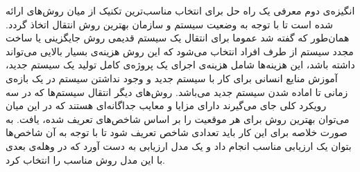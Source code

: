 انگیزه‌ی دوم معرفی یک راه حل برای انتخاب مناسب‌ترین تکنیک از میان روش‌های ارائه شده است  تا با توجه به وضعیت سیستم  و سازمان بهترین روش انتقال اتخاذ گردد. همان‌طور که گفته شد عموما برای انتقال یک سیستم قدیمی روش جایگزینی یا ساخت مجدد سیستم از طرف افراد انتخاب می‌شود که این روش هزینه‌ی بسیار بالایی می‌تواند داشته باشد،‌ این هزینه‌ها شامل هزینه‌ی اجرای یک پروژه‌ی کامل تولید یک سیستم جدید، آموزش منایع انسانی برای کار با سیستم جدید و وجود نداشتن سیستم در یک بازه‌ی زمانی تا اماده شدن سیستم جدید می‌باشد. روش‌های دیگر انتقال سیستم‌ها که در سه رویکرد کلی جای می‌گیرند دارای مزایا و معایب جداگانه‌ای هستند که در این میان می‌توان بهترین روش برای هر موقعیت را بر اساس شاخص‌های تعریف شده، یافت. به صورت خلاصه برای این کار باید تعدادی شاخص تعریف شود تا با توجه به آن شاخص‌ها بتوان یک ارزیابی مناسب انجام داد و یک مدل ارزیابی به دست آورد که در وهله‌ی  بعدی با این مدل روش مناسب را انتخاب کرد. 

